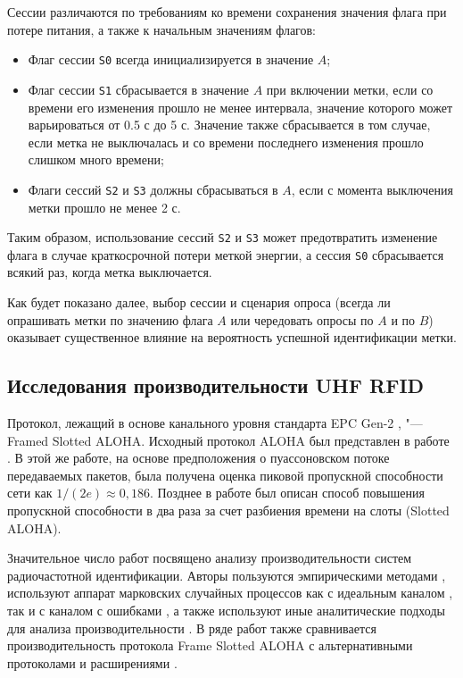 Сессии различаются по требованиям ко времени сохранения значения флага при потере питания, а также к начальным значениям флагов:

\begin{itemize}
	\item Флаг сессии \texttt{S0} всегда инициализируется в значение $A$;
	\item Флаг сессии \texttt{S1} сбрасывается в значение $A$ при включении метки, если со времени его изменения прошло не менее интервала, значение которого может варьироваться от 0.5 с до 5 с. Значение также сбрасывается в том случае, если метка не выключалась и со времени последнего изменения прошло слишком много времени;
	\item Флаги сессий \texttt{S2} и \texttt{S3} должны сбрасываться в $A$, если с момента выключения метки прошло не менее 2 с.
\end{itemize}

Таким образом, использование сессий \texttt{S2} и \texttt{S3} может предотвратить изменение флага в случае краткосрочной потери меткой энергии, а сессия \texttt{S0} сбрасывается всякий раз, когда метка выключается.

Как будет показано далее, выбор сессии и сценария опроса (всегда ли опрашивать метки по значению флага $A$ или чередовать опросы по $A$ и по $B$) оказывает существенное влияние на вероятность успешной идентификации метки.



\subsection{Исследования производительности UHF RFID}

Протокол, лежащий в основе канального уровня стандарта EPC Gen-2 \cite{std_gen2}, "--- Framed Slotted ALOHA. Исходный протокол ALOHA был представлен в работе \cite{Roberts1975}. В этой же работе, на основе предположения о пуассоновском потоке передаваемых пакетов, была получена оценка пиковой пропускной способности сети как $1/(2e) \approx 0,186$. Позднее в работе \cite{Abramson1970} был описан способ повышения пропускной способности в два раза за счет разбиения времени на слоты (Slotted ALOHA).

Значительное число работ посвящено анализу производительности систем радиочастотной идентификации. Авторы пользуются эмпирическими методами \cite{Buettner2008}, используют аппарат марковских случайных процессов как с идеальным каналом \cite{Wang2009, Vahedi2012, Vales-Alonso2009, Vales-Alonso2011, Qiaoling2007}, так и с каналом с ошибками \cite{DiMarco2014}, а также используют иные аналитические подходы для анализа производительности \cite{Ahmed2016, Yan2014, Jeon2009}. В ряде работ также сравнивается производительность протокола Frame Slotted ALOHA с альтернативными протоколами и расширениями \cite{Vahedi2014, LaPorta2011}.


